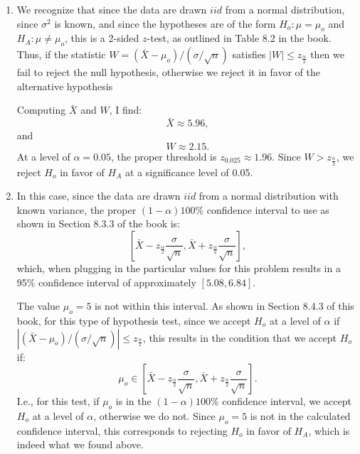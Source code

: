 \begin{problem}{15}$ $
\begin{enumerate}

\item We recognize that since the data are drawn $iid$ from a normal distribution, since $\sigma^2$ is known, and since the hypotheses are of the form $H_o: \mu = \mu_o$ and $H_A:\mu \neq \mu_o$, this is a 2-sided $z$-test, as outlined in Table 8.2 in the book.  Thus, if the statistic $W=(\bar X-\mu_o)/(\sigma/\sqrt{n})$ satisfies $|W| \le z_{\frac{\alpha}{2}}$ then we fail to reject the null hypothesis, otherwise we reject it in favor of the alternative hypothesis

Computing $\bar X$ and $W$, I find:
\begin{equation*}
\bar X \approx 5.96,
\end{equation*}
and 
\begin{equation*}
W \approx 2.15.
\end{equation*}
At a level of $\alpha=0.05$, the proper threshold is $z_{0.025} \approx 1.96$.  Since $W>z_{\frac{\alpha}{2}}$, we reject $H_o$ in favor of $H_A$ at a significance level of 0.05.

\item  In this case, since the data are drawn $iid$ from a normal distribution with known variance, the proper $(1-\alpha)100\%$ confidence interval to use as shown in Section 8.3.3 of the book is:
\begin{equation*}
\left[\bar X- z_{\frac{\alpha}{2}}\frac{\sigma}{\sqrt{n}}, \bar X+ z_{\frac{\alpha}{2}}\frac{\sigma}{\sqrt{n}}  \right],
\end{equation*}
which, when plugging in the particular values for this problem results in a 95\% confidence interval of approximately $[5.08, 6.84]$.

The value $\mu_o = 5 $ is not within this interval.  As shown in Section 8.4.3 of this book, for this type of hypothesis test, since we accept $H_o$ at a level of $\alpha$ if $|(\bar X-\mu_o)/(\sigma/\sqrt{n})| \le z_{\frac{\alpha}{2}}$, this results in the condition that we accept $H_o$ if:
\begin{equation*}
\mu_o \in \left[\bar X- z_{\frac{\alpha}{2}}\frac{\sigma}{\sqrt{n}}, \bar X+ z_{\frac{\alpha}{2}}\frac{\sigma}{\sqrt{n}}  \right].
\end{equation*}
I.e., for this test, if $\mu_o$ is in the $(1-\alpha)100\%$ confidence interval, we accept $H_o$ at a level of $\alpha$, otherwise we do not.  Since $\mu_o = 5 $ is not in the calculated confidence interval, this corresponds to rejecting $H_o$ in favor of $H_A$, which is indeed what we found above.


\end{enumerate}

\end{problem} 


